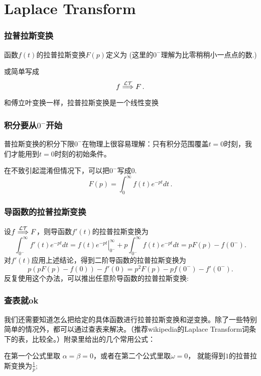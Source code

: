 \documentclass[CJK]{beamer}
\begin{document}
\section{Laplace Transform}


\begin{frame}
\frametitle{拉普拉斯变换}

函数$f(t)$的拉普拉斯变换$F(p)$定义为
(这里的$0^-$理解为比零稍稍小一点点的数.)

  或简单写成
  {\blue  $$ f \stackrel{\mathcal{LT}}{\Longrightarrow} F\,. $$}

  和傅立叶变换一样，拉普拉斯变换是一个线性变换

\end{frame}


\begin{frame}
  \frametitle{积分要从$0^-$开始}
  
  普拉斯变换的积分下限$0^-$在物理上很容易理解：只有积分范围覆盖$t=0$时刻，我们才能用到$t=0$时刻的初始条件。


    \skiplines
    
    在不致引起混淆但情况下，可以把$0^-$写成0.
    $$ F(p) = \int_{0}^\infty f(t) e^{-pt} dt\,. $$    
  
\end{frame}


\begin{frame}
\frametitle{导函数的拉普拉斯变换}

设$f \stackrel{\mathcal{LT}}{\Longrightarrow} F$，则导函数$f'(t)$的拉普拉斯变换为
$$ \int_{0^-}^\infty f'(t) e^{-pt} dt =\left.f(t)e^{-pt}\right\vert_{0^-}^\infty + p \int_{0^-}^\infty f(t)e^{-pt} dt = pF(p) - f(0^-). $$
对$f'(t)$应用上述结论，得到二阶导函数的拉普拉斯变换为
$$ p(pF(p) - f(0)) - f'(0) = p^2F(p) - pf(0^-) - f'(0^-).$$
反复使用这个办法，可以推出任意阶导函数的拉普拉斯变换:


\end{frame}





\begin{frame}
  \frametitle{查表就ok}
  我们还需要知道怎么把给定的具体函数进行拉普拉斯变换和逆变换。除了一些特别简单的情况外，都可以通过{\blue 查表}来解决。（推荐wikipedia的Laplace Transform词条下的表，比较全。）附录里给出的几个常用公式：

在第一个公式里取 $\alpha = \beta=0$，或者在第二个公式里取$\omega = 0$， 就能得到$1$的拉普拉斯变换为$\frac{1}{p}$;

\end{frame}
\end{document}
